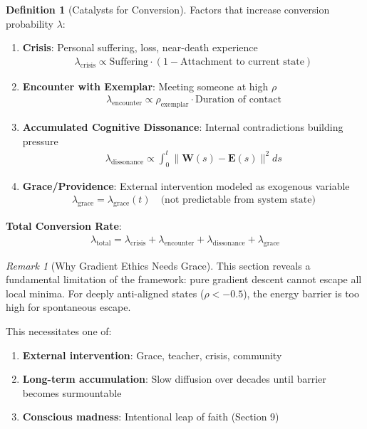 \documentclass[11pt,a4paper]{article}
\theoremstyle{definition}
\newtheorem{definition}{Definition}[section]
\theoremstyle{remark}
\newtheorem{remark}{Remark}[section]
\newcommand{\EE}{\mathbf{E}}
\newcommand{\WW}{\mathbf{W}}
\begin{document}
\begin{enumerate}
\begin{definition}[Catalysts for Conversion]
Factors that increase conversion probability \(\lambda\):

\begin{enumerate}
    \item \textbf{Crisis}: Personal suffering, loss, near-death experience
    \begin{align}
    \lambda_{\text{crisis}} \propto \text{Suffering} \cdot (1 - \text{Attachment to current state})
    \end{align}
    
    \item \textbf{Encounter with Exemplar}: Meeting someone at high \(\rho\)
    \begin{align}
    \lambda_{\text{encounter}} \propto \rho_{\text{exemplar}} \cdot \text{Duration of contact}
    \end{align}
    
    \item \textbf{Accumulated Cognitive Dissonance}: Internal contradictions building pressure
    \begin{align}
    \lambda_{\text{dissonance}} \propto \int_0^t \|\WW(s) - \EE(s)\|^2 ds
    \end{align}
    
    \item \textbf{Grace/Providence}: External intervention modeled as exogenous variable
    \begin{align}
    \lambda_{\text{grace}} = \lambda_{\text{grace}}(t) \quad \text{(not predictable from system state)}
    \end{align}
\end{enumerate}

\textbf{Total Conversion Rate}:
\begin{align}
\lambda_{\text{total}} = \lambda_{\text{crisis}} + \lambda_{\text{encounter}} + \lambda_{\text{dissonance}} + \lambda_{\text{grace}}
\end{align}
\end{definition}

\begin{remark}[Why Gradient Ethics Needs Grace]
This section reveals a fundamental limitation of the framework: pure gradient descent cannot escape all local minima. For deeply anti-aligned states (\(\rho < -0.5\)), the energy barrier is too high for spontaneous escape.

This necessitates one of:
\begin{enumerate}
    \item \textbf{External intervention}: Grace, teacher, crisis, community
    \item \textbf{Long-term accumulation}: Slow diffusion over decades until barrier becomes surmountable
    \item \textbf{Conscious madness}: Intentional leap of faith (Section 9)
\end{enumerate}


\end{remark}
\end{enumerate}
\end{document}
